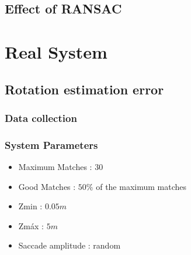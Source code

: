 \subsection{Effect of RANSAC}

\section{Real System}
\subsection{Rotation estimation error}
\subsubsection{Data collection}
\subsubsection{System Parameters}
\begin{itemize}
	\item Maximum Matches : $30$
	\item Good Matches : $50 \%$ of the maximum matches
	\item Zmin : $0.05 m$
	\item Zmáx : $5 m$
	\item Saccade amplitude : random
\end{itemize}
